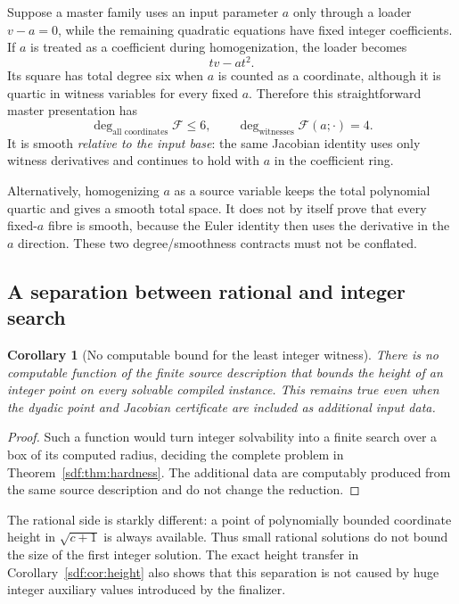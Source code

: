 \documentclass[11pt,a4paper]{article}
\newtheorem{corollary}[theorem]{Corollary}
\theoremstyle{definition}
\theoremstyle{remark}
\begin{document}
Suppose a master family uses an input parameter $a$ only through a loader
$v-a=0$, while the remaining quadratic equations have fixed integer
coefficients. If $a$ is treated as a coefficient during homogenization,
the loader becomes
\[
 tv-at^2.
\]
Its square has total degree six when $a$ is counted as a coordinate,
although it is quartic in witness variables for every fixed $a$.
Therefore this straightforward master presentation has
\[
 \deg_{\text{all coordinates}}\mathcal F\le6,
 \qquad \deg_{\text{witnesses}}\mathcal F(a;\cdot)=4.
\]
It is smooth \emph{relative to the input base}: the same Jacobian identity
uses only witness derivatives and continues to hold with $a$ in the
coefficient ring.

Alternatively, homogenizing $a$ as a source variable keeps the total
polynomial quartic and gives a smooth total space. It does not by itself
prove that every fixed-$a$ fibre is smooth, because the Euler identity
then uses the derivative in the $a$ direction. These two degree/smoothness
contracts must not be conflated.

\subsection{A separation between rational and integer search}

\begin{corollary}[No computable bound for the least integer witness]\label{sdf:cor:nobound}
There is no computable function of the finite source description that
bounds the height of an integer point on every solvable compiled instance.
This remains true even when the dyadic point and Jacobian certificate are
included as additional input data.
\end{corollary}
\begin{proof}
Such a function would turn integer solvability into a finite search over a
box of its computed radius, deciding the complete problem in
Theorem~\ref{sdf:thm:hardness}. The additional data are computably produced
from the same source description and do not change the reduction.
\end{proof}

The rational side is starkly different: a point of polynomially bounded
coordinate height in $\sqrt{c+1}$ is always available. Thus small rational
solutions do not bound the size of the first integer solution. The exact
height transfer in Corollary~\ref{sdf:cor:height} also shows that this
separation is not caused by huge integer auxiliary values introduced by
the finalizer.
\end{document}
